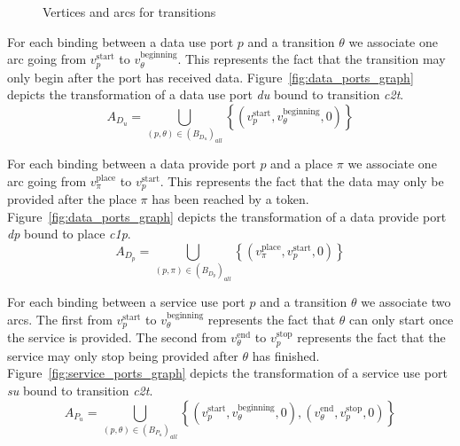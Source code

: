 \begin{figure}[h]
{\begin{minipage}[c]{0.5\columnwidth}
    \end{minipage}
  }
  \caption{Vertices and arcs for transitions}
  \label{fig:transition_graph}
\end{figure}

For each binding between a data use port $p$ and a transition $\theta$ we
associate one arc going from $v_p^\text{start}$ to $v_\theta^\text{beginning}$.
This represents the fact that the transition may only begin after the port has
received data.
Figure~\ref{fig:data_ports_graph} depicts the transformation of a
data use port \emph{du} bound to transition \emph{c2t}.
\[
A_{D_{u}}=\bigcup_{\left(p,\theta\right)\in\left(B_{D_{u}}\right)_{all}}\left\{ \left(v_p^\text{start},v_\theta^\text{beginning},0\right)\right\} 
\]

For each binding between a data provide port $p$ and a place $\pi$ we associate
one arc going from $v_\pi^\text{place}$ to $v_p^\text{start}$. This represents
the fact that the data may only be provided after the place $\pi$ has been
reached by a token.
Figure~\ref{fig:data_ports_graph} depicts the transformation of a
data provide port \emph{dp} bound to place \emph{c1p}.
\[
A_{D_{p}}=\bigcup_{\left(p,\pi\right)\in\left(B_{D_{p}}\right)_{all}}\left\{ \left(v_\pi^\text{place},v_p^\text{start},0\right)\right\} 
\]

For each binding between a service use port $p$ and a transition $\theta$ we
associate two arcs. The first from $v_p^\text{start}$ to
$v_\theta^\text{beginning}$ represents the fact that $\theta$ can only start
once the service is provided. The second from $v_\theta^\text{end}$ to
$v_p^\text{stop}$ represents the fact that the service may only stop being
provided after $\theta$ has finished.
Figure~\ref{fig:service_ports_graph} depicts the transformation of a
service use port \emph{su} bound to transition \emph{c2t}.
\[
A_{P_{u}}=\bigcup_{\left(p,\theta\right)\in\left(B_{P_{u}}\right)_{all}}\left\{ \left(v_p^\text{start},v_\theta^\text{beginning},0\right),\left(v_\theta^\text{end},v_p^\text{stop},0\right)\right\} 
\]


